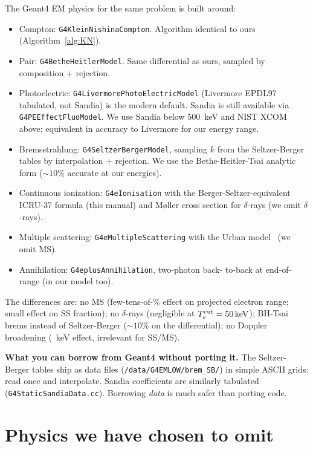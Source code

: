 \documentclass[11pt,a4paper]{article}
\newcommand{\Tcut}{T_e^{\rm cut}}
\begin{document}
The {\sc Geant4} EM physics for the same problem is built around:
\begin{itemize}\itemsep=0pt
  \item Compton: \verb|G4KleinNishinaCompton|. Algorithm identical
        to ours (Algorithm~\ref{alg:KN}).
  \item Pair: \verb|G4BetheHeitlerModel|. Same differential as
        ours, sampled by composition + rejection.
  \item Photoelectric: \verb|G4LivermorePhotoElectricModel|
        (Livermore EPDL97 tabulated, not Sandia) is the modern
        default. Sandia is still available via
        \verb|G4PEEffectFluoModel|. We use Sandia below
        \SI{500}{keV} and NIST XCOM above; equivalent in accuracy
        to Livermore for our energy range.
  \item Bremsstrahlung: \verb|G4SeltzerBergerModel|, sampling $k$
        from the Seltzer-Berger tables by interpolation +
        rejection. We use the Bethe-Heitler-Tsai analytic form
        ($\sim 10\%$ accurate at our energies).
  \item Continuous ionization: \verb|G4eIonisation| with the
        Berger-Seltzer-equivalent ICRU-37 formula (this manual)
        and M\o{}ller cross section for $\delta$-rays (we omit
        $\delta$-rays).
  \item Multiple scattering: \verb|G4eMultipleScattering| with
        the Urban model~\cite{Urban2010} (we omit MS).
  \item Annihilation: \verb|G4eplusAnnihilation|, two-photon back-
        to-back at end-of-range (in our model too).
\end{itemize}

The differences are: no MS (few-tens-of-\% effect on projected
electron range; small effect on SS fraction); no $\delta$-rays
(negligible at $\Tcut=\SI{50}{keV}$); BH-Tsai brems instead of
Seltzer-Berger ($\sim 10\%$ on the differential); no Doppler
broadening (~keV effect, irrelevant for SS/MS).

\begin{remarkbox}
\textbf{What you can borrow from {\sc Geant4} without porting it.}
The Seltzer-Berger tables ship as data files
(\verb|/data/G4EMLOW/brem_SB/|) in simple ASCII grids: read once
and interpolate. Sandia coefficients are similarly tabulated
(\verb|G4StaticSandiaData.cc|). Borrowing \emph{data} is much
safer than porting code.
\end{remarkbox}

\section{Physics we have chosen to omit}\label{sec:limits}
\end{document}
